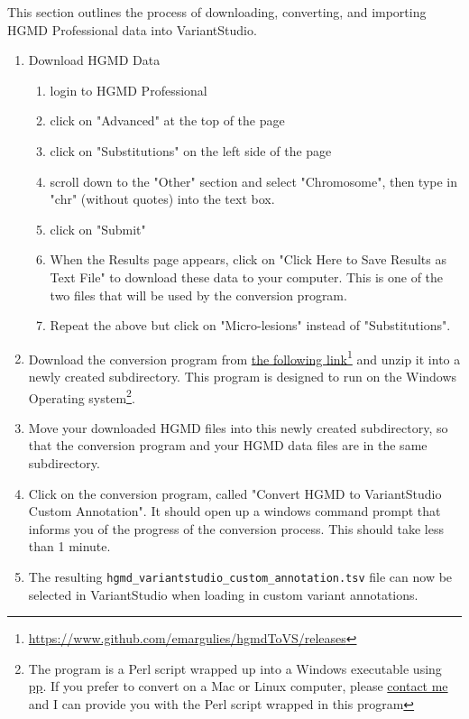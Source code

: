 \documentclass[11pt,titlepage,a4paper]{article}
\newcommand{\downloadURL}{https://www.github.com/emargulies/hgmdToVS/releases}
\begin{document}
This section outlines the process of downloading, converting, and importing HGMD Professional data into VariantStudio.

\begin{enumerate}
	\item Download HGMD Data
		\begin{enumerate}
			\item login to HGMD Professional
			\item click on "Advanced" at the top of the page
			\item click on "Substitutions" on the left side of the page
			\item scroll down to the "Other" section and select "Chromosome", then type in "chr" (without quotes) into the text box.
			\item click on "Submit"
			\item When the Results page appears, click on "Click Here to Save Results as Text File" to download these data to your computer. This is one of the two files that will be used by the conversion program.
			\item Repeat the above but click on "Micro-lesions" instead of "Substitutions". 
		\end{enumerate}
	\item Download the conversion program from \href{\downloadURL}{the following link}\footnote{\url{\downloadURL}} and unzip it into a newly created subdirectory. This program is designed to run on the Windows Operating system\footnote{The program is a Perl script wrapped up into a Windows executable using \href{http://search.cpan.org/~autrijus/PAR/script/pp}{pp}. If you prefer to convert on a Mac or Linux computer, please \href{mailto:emargulies@illumina.com}{contact me} and I can provide you with the Perl script wrapped in this program}.
	
\item Move your downloaded HGMD files into this newly created subdirectory, so that the conversion program and your HGMD data files are in the same subdirectory.

\item Click on the conversion program, called "Convert HGMD to VariantStudio Custom Annotation". It should open up a windows command prompt that informs you of the progress of the conversion process. This should take less than 1 minute.

\item The resulting \texttt{hgmd\_variantstudio\_custom\_annotation.tsv} file can now be selected in VariantStudio when loading in custom variant annotations.

\end{enumerate}
\end{document}
